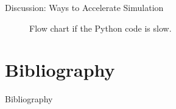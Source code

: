\documentclass[10pt, xcolor = svgnames, aspectratio=43]{beamer} %
\begin{document}
\begin{frame}{Discussion: Ways to Accelerate Simulation}
\begin{figure}
\caption{Flow chart if the Python code is slow.}
\label{FC}
\end{figure}
\end{frame}




\section{Bibliography}


\begin{frame}[allowframebreaks]{Bibliography}
\nocite{*}


\end{frame}
\end{document}
